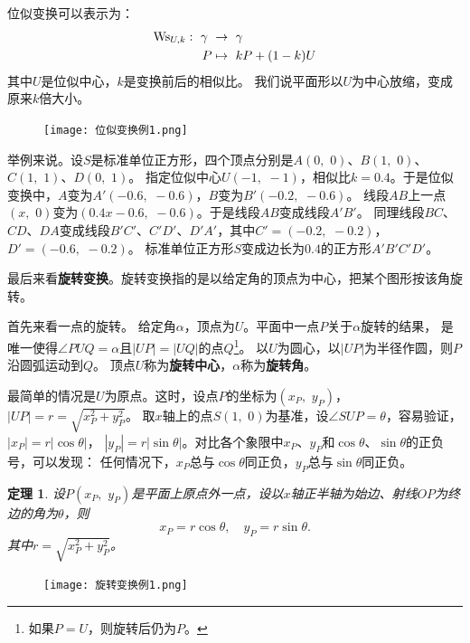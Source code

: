 \documentclass[12pt,UTF8]{ctexbook}
\newtheorem{tm}{定理}[section]
\begin{document}
位似变换可以表示为：
\begin{align}
    \mathrm{Ws}_{U, k} : \,\, \gamma\,\,&\rightarrow \,\, \gamma \notag \\
    P &\mapsto \,\, kP + (1 - k)U \notag
\end{align}
其中$U$是位似中心，$k$是变换前后的相似比。
我们说平面形以$U$为中心放缩，变成原来$k$倍大小。

\begin{figure} %
    \vspace{-12pt}
    \flushright
    \texttt{[image: 位似变换例1.png]}
\end{figure}

举例来说。设$S$是标准单位正方形，四个顶点分别是$A(0,\,\,0)$、$B(1,\,\,0)$、$C(1,\,\,1)$、$D(0,\,\,1)$。
指定位似中心$U(-1,\,\,-1)$，相似比$k=0.4$。于是位似变换中，$A$变为$A'(-0.6,\,\,-0.6)$，$B$变为$B'(-0.2,\,\,-0.6)$。
线段$AB$上一点$(x,\,\,0)$变为$(0.4x - 0.6, \,\, -0.6)$。于是线段$AB$变成线段$A'B'$。
同理线段$BC$、$CD$、$DA$变成线段$B'C'$、$C'D'$、$D'A'$，其中$C'=(-0.2,\,\, -0.2)$，$D'=(-0.6,\,\,-0.2)$。
标准单位正方形$S$变成边长为$0.4$的正方形$A'B'C'D'$。

最后来看\textbf{旋转变换}。旋转变换指的是以给定角的顶点为中心，把某个图形按该角旋转。

首先来看一点的旋转。
给定角$\alpha$，顶点为$U$。平面中一点$P$关于$\alpha$旋转的结果，
是唯一使得$\angle PUQ = \alpha$且$|UP| = |UQ|$的点$Q$\footnote{如果$P=U$，则旋转后仍为$P$。}。
以$U$为圆心，以$|UP|$为半径作圆，则$P$沿圆弧运动到$Q$。
顶点$U$称为\textbf{旋转中心}，$\alpha$称为\textbf{旋转角}。

最简单的情况是$U$为原点。这时，设点$P$的坐标为$(x_P,\,\,y_P)$，$|UP| = r = \sqrt{x_P^2 + y_P^2}$。
取$x$轴上的点$S(1,\,\,0)$为基准，设$\angle SUP = \theta$，容易验证，$|x_P| = r|\cos{\theta}|$，
$|y_P| = r|\sin{\theta}|$。对比各个象限中$x_P$、$y_P$和$\cos{\theta}$、$\sin{\theta}$的正负号，可以发现：
任何情况下，$x_P$总与$\cos{\theta}$同正负，$y_P$总与$\sin{\theta}$同正负。

\begin{tm}
    设$P(x_P,\,\,y_P)$是平面上原点外一点，设以$x$轴正半轴为始边、射线$OP$为终边的角为$\theta$，则
    $$ x_P = r\cos{\theta},\quad y_P = r\sin{\theta}.$$
    其中$r = \sqrt{x_P^2 + y_P^2}$。
\end{tm}

\begin{figure} %
    \vspace{-40pt}
    \flushright
    \texttt{[image: 旋转变换例1.png]}
\end{figure}
\end{document}
